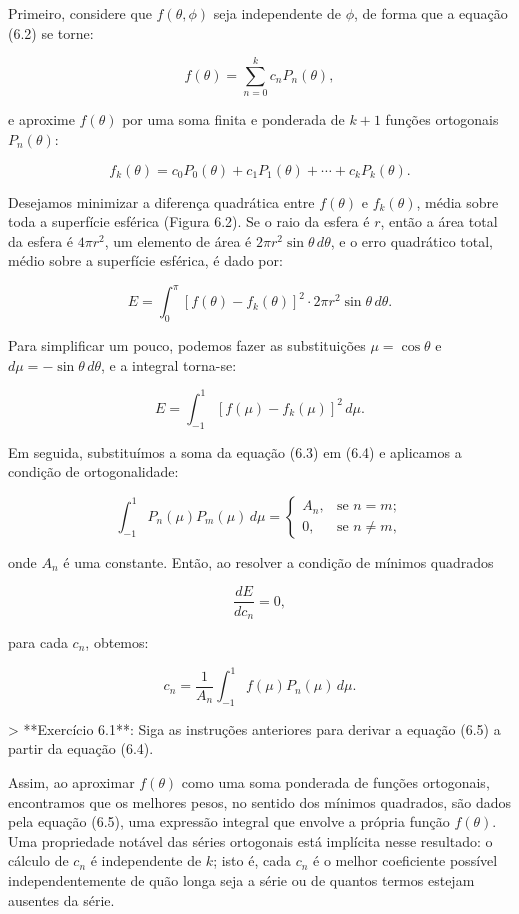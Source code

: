 Primeiro, considere que $f(\theta, \phi)$ seja independente de $\phi$, de forma que a equação (6.2) se torne:

$$
f(\theta) = \sum_{n=0}^{k} c_n P_n(\theta),
$$

e aproxime $f(\theta)$ por uma soma finita e ponderada de $k + 1$ funções ortogonais $P_n(\theta)$:

$$
f_k(\theta) = c_0 P_0(\theta) + c_1 P_1(\theta) + \cdots + c_k P_k(\theta). \tag{6.3}
$$

Desejamos minimizar a diferença quadrática entre $f(\theta)$ e $f_k(\theta)$, média sobre toda a superfície esférica (Figura 6.2). Se o raio da esfera é $r$, então a área total da esfera é $4\pi r^2$, um elemento de área é $2\pi r^2 \sin\theta \, d\theta$, e o erro quadrático total, médio sobre a superfície esférica, é dado por:

$$
E = \int_0^\pi [f(\theta) - f_k(\theta)]^2 \cdot 2\pi r^2 \sin\theta \, d\theta.
$$

Para simplificar um pouco, podemos fazer as substituições $\mu = \cos\theta$ e $d\mu = -\sin\theta \, d\theta$, e a integral torna-se:

$$
E = \int_{-1}^{1} [f(\mu) - f_k(\mu)]^2 \, d\mu. \tag{6.4}
$$

Em seguida, substituímos a soma da equação (6.3) em (6.4) e aplicamos a condição de ortogonalidade:

$$
\int_{-1}^{1} P_n(\mu) P_m(\mu) \, d\mu =
\begin{cases}
A_n, & \text{se } n = m; \\
0, & \text{se } n \ne m,
\end{cases}
$$

onde $A_n$ é uma constante. Então, ao resolver a condição de mínimos quadrados

$$
\frac{dE}{dc_n} = 0,
$$

para cada $c_n$, obtemos:

$$
c_n = \frac{1}{A_n} \int_{-1}^{1} f(\mu) P_n(\mu) \, d\mu. \tag{6.5}
$$

> **Exercício 6.1**: Siga as instruções anteriores para derivar a equação (6.5) a partir da equação (6.4).

Assim, ao aproximar $f(\theta)$ como uma soma ponderada de funções ortogonais, encontramos que os melhores pesos, no sentido dos mínimos quadrados, são dados pela equação (6.5), uma expressão integral que envolve a própria função $f(\theta)$. Uma propriedade notável das séries ortogonais está implícita nesse resultado: o cálculo de $c_n$ é independente de $k$; isto é, cada $c_n$ é o melhor coeficiente possível independentemente de quão longa seja a série ou de quantos termos estejam ausentes da série.

